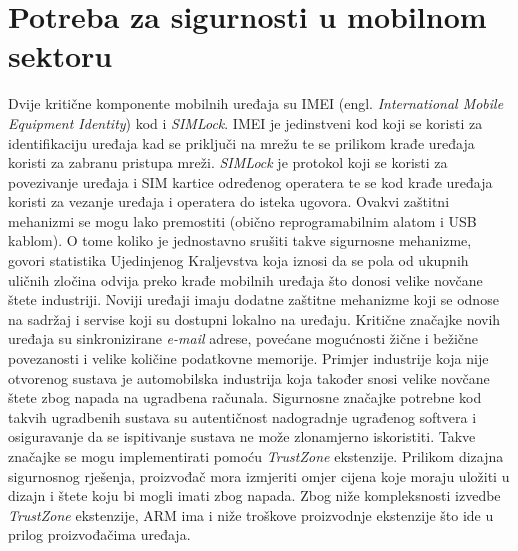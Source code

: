 \documentclass[times, utf8, diplomski, numeric]{fer}
\begin{document}
\section{Potreba za sigurnosti u mobilnom sektoru}
Dvije kritične komponente mobilnih uređaja su IMEI (engl. \textit{International Mobile Equipment Identity}) kod i
\textit{SIMLock}. IMEI je jedinstveni kod koji se koristi za identifikaciju uređaja kad se priključi na mrežu te se prilikom
krađe uređaja koristi za zabranu pristupa mreži. \textit{SIMLock} je protokol koji se koristi za povezivanje uređaja i
SIM kartice određenog operatera te se kod krađe uređaja koristi za vezanje uređaja i operatera do isteka ugovora. Ovakvi
zaštitni mehanizmi se mogu lako premostiti (obično reprogramabilnim alatom i USB kablom). O tome koliko je jednostavno
srušiti takve sigurnosne mehanizme, govori statistika Ujedinjenog Kraljevstva koja iznosi da se pola od ukupnih uličnih
zločina odvija preko krađe mobilnih uređaja što donosi velike novčane štete industriji. Noviji uređaji imaju dodatne
zaštitne mehanizme koji se odnose na sadržaj i servise koji su dostupni lokalno na uređaju. Kritične značajke novih
uređaja su sinkronizirane \textit{e-mail} adrese, povećane mogućnosti žične i bežične povezanosti i velike količine
podatkovne memorije. Primjer industrije koja nije otvorenog sustava je automobilska industrija koja također snosi velike
novčane štete zbog napada na ugradbena računala. Sigurnosne značajke potrebne kod takvih ugradbenih sustava su autentičnost
nadogradnje ugrađenog softvera i osiguravanje da se ispitivanje sustava ne može zlonamjerno iskoristiti.
Takve značajke se mogu implementirati pomoću \textit{TrustZone} ekstenzije. Prilikom dizajna sigurnosnog rješenja, proizvođač
mora izmjeriti omjer cijena koje moraju uložiti u dizajn i štete koju bi mogli imati zbog napada. Zbog niže kompleksnosti
izvedbe \textit{TrustZone} ekstenzije, ARM ima i niže troškove proizvodnje ekstenzije što ide u prilog proizvođačima
uređaja.
\end{document}
